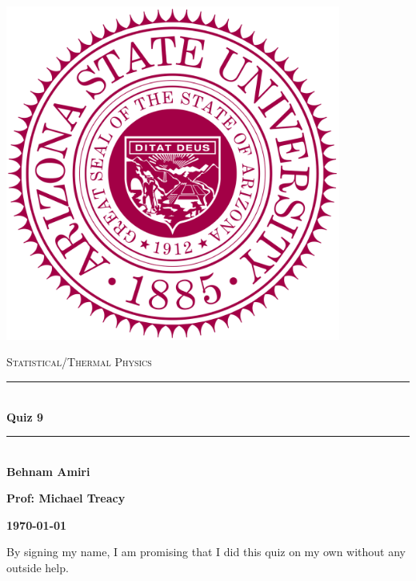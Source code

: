 \documentclass[fleqn]{article}
\begin{document}
  \begin{titlepage}

    \newcommand{\HRule}{\rule{\linewidth}{0.5mm}}

    \center

    \begin{center}
      \includegraphics[height=11cm, width=11cm]{asu.png}
    \end{center}

    \vline

    \textsc{\LARGE Statistical/Thermal Physics}\\[1.5cm]

    \HRule \\[0.5cm]
    { \huge \bfseries Quiz 9}\\[0.4cm] 
    \HRule \\[1.0cm]

    \textbf{Behnam Amiri}

    \bigbreak

    \textbf{Prof: Michael Treacy}

    \bigbreak

    \textbf{{\large \today}\\[2cm]}

    \vfill

  \end{titlepage}

  By signing my name, I am promising that I did this quiz on my own without any outside help.

  \vspace{0.5cm}
\end{document}
